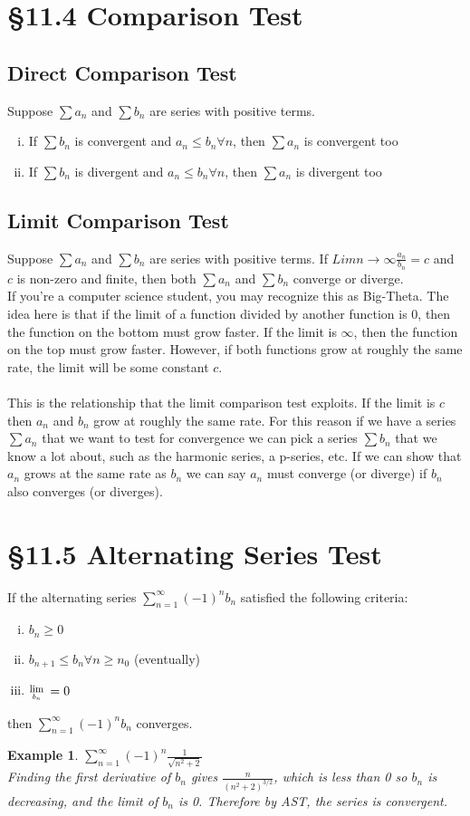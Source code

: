 \documentclass[12 pt]{article}
\newcommand{\Lim}[1]{\raisebox{0.5ex}{\scalebox{0.8}{$\displaystyle \lim_{#1}\;$}}}
\newcommand{\sumo}{\sum\limits_{n=1}^{\infty}}
\newcommand{\toinfty}{\rightarrow\infty}
\newtheorem*{exmp*}{Example}
\begin{document}
	\section{\S 11.4 Comparison Test}
		\subsection{Direct Comparison Test}
		Suppose $\sum a_n$ and $\sum b_n$ are series with positive terms.
		\begin{enumerate}[i)]
			\item If $\sum b_n$ is convergent and $a_n\leq b_n \forall n$, then $\sum a_n$ is convergent too
			\item If $\sum b_n$ is divergent and $a_n\leq b_n \forall n$, then $\sum a_n$ is divergent too
		\end{enumerate}

		\subsection{Limit Comparison Test}
		Suppose $\sum a_n$ and $\sum b_n$ are series with positive terms. If $Lim{n\toinfty} \frac{a_n}{b_n}=c$ and $c$ is non-zero and finite, then both $\sum a_n$ and $\sum b_n$ converge or diverge.\\

		If you're a computer science student, you may recognize this as Big-Theta. The idea here is that if the limit of a function divided by another function is 0, then the function on the bottom must grow faster. If the limit is $\infty$, then the function on the top must grow faster. However, if both functions grow at roughly the same rate, the limit will be some constant $c$.\\\\ This is the relationship that the limit comparison test exploits. If the limit is $c$ then $a_n$ and $b_n$ grow at roughly the same rate. For this reason if we have a series $\sum a_n$ that we want to test for convergence we can pick a series $\sum b_n$ that we know a lot about, such as the harmonic series, a p-series, etc. If we can show that $a_n$ grows at the same rate as $b_n$ we can say $a_n$ must converge (or diverge) if $b_n$ also converges (or diverges).

	\section{\S 11.5 Alternating Series Test}
		If the alternating series $\sumo (-1)^nb_n$ satisfied the following criteria:
		\begin{enumerate}[i)]
			\item $b_n\geq 0$
			\item $b_{n+1}\leq b_n \forall n\geq n_0$ (eventually)
			\item $\Lim{b_n}=0$
		\end{enumerate}
		then $\sumo (-1)^nb_n$ converges.
		\begin{exmp*}
			$\sumo (-1)^n\frac{1}{\sqrt{n^2+2}}$\\
			Finding the first derivative of $b_n$ gives $\frac{n}{(n^2+2)^{3/2}}$, which is less than 0 so $b_n$ is decreasing, and the limit of $b_n$ is 0. Therefore by AST, the series is convergent.
		\end{exmp*}
\end{document}
